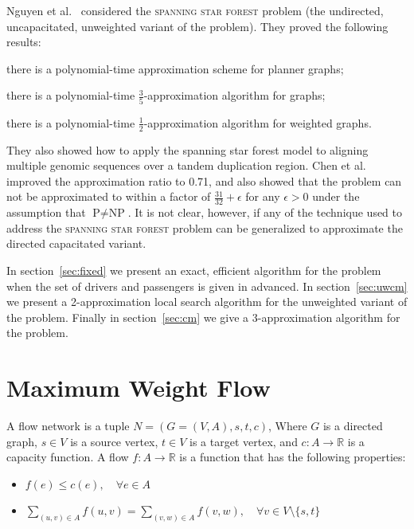 \documentclass[]{llncs}
\def\R{\mathbb{R}}
\begin{document}
Nguyen et al.~\cite{nguyen2008approximating} considered the \textsc{spanning star forest} problem
(the undirected, uncapacitated, unweighted variant of the problem).
They proved the following results:
\begin{enumerate*}
\item
there is a polynomial-time approximation scheme for planner graphs;
\item 
there is a polynomial-time $\frac{3}{5}$-approximation algorithm for graphs;
\item 
there is a polynomial-time $\frac{1}{2}$-approximation algorithm for weighted graphs.
\end{enumerate*}
They also showed how to apply the spanning star forest model to aligning multiple
genomic sequences over a tandem duplication region.
Chen et al.~\cite{chen2007improved} improved the approximation ratio to 0.71,
and also showed that the problem can not be approximated to within a factor of
$\frac{31}{32} + \epsilon$ for any $\epsilon > 0$ under the assumption 
that $\text{P} \neq \text{NP}$.
It is not clear, however, if any of the technique used to address the
\textsc{spanning star forest} problem can be generalized to approximate the
directed capacitated variant.

In section~\ref{sec:fixed} we present an exact, efficient algorithm for the
problem when the set of drivers and passengers is given in advanced.
In section~\ref{sec:uwcm} we present a 2-approximation local search algorithm
for the unweighted variant of the problem.
Finally in section~\ref{sec:cm} we
give a 3-approximation algorithm for the problem.

\section{Maximum Weight Flow}
\label{sec:carpool:preliminary}
A flow network is a tuple $N = (G = (V, A), s, t, c)$, 
Where $G$ is a directed graph, 
$s \in V$ is a source vertex, 
$t \in V$ is a target vertex, 
and $c : A \rightarrow \R$ is a capacity function. 
A flow $f : A \rightarrow \R$ is a function that has the following properties:
\begin{itemize}
\item
$f(e) \leq c(e), \quad \forall e \in A$

\item
$\sum_{(u, v) \in A} f(u, v) = \sum_{(v, w) \in A} f(v, w), \quad \forall v \in V \setminus \{s, t\}$
\end{itemize}
\end{document}
